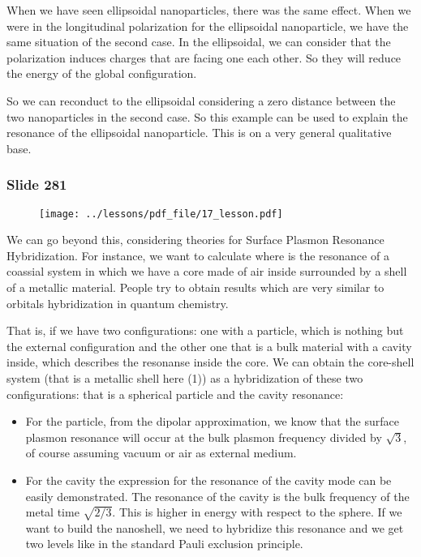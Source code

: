 \documentclass[../main/main.tex]{subfiles}
\begin{document}
When we have seen ellipsoidal nanoparticles, there was the same effect. When we were in the longitudinal polarization for the ellipsoidal nanoparticle, we have the same situation of the second case. In the ellipsoidal, we can consider that the polarization induces charges that are facing one each other. So they will reduce the energy of the global configuration.

So we can reconduct to the ellipsoidal considering a zero distance between the two nanoparticles in the second case. So this example can be used to explain the resonance of the ellipsoidal nanoparticle.
This is on a very general qualitative base.


\newpage

\subsubsection{Slide 281}

\begin{figure}[h!]
\centering
\texttt{[image: ../lessons/pdf\_file/17\_lesson.pdf]}
\end{figure}

We can go beyond this, considering theories for Surface Plasmon Resonance Hybridization.
For instance, we want to calculate where is the resonance of a coassial system in which we have a core made of air inside surrounded by a shell of a metallic material.
People try to obtain results which are very similar to orbitals hybridization in quantum chemistry.

That is, if we have two configurations:
one with a particle, which is nothing but the external configuration and the other one that is a bulk material with a cavity inside, which describes the resonanse inside the core.
We can obtain the core-shell system (that is a metallic shell here (1)) as a hybridization of these two configurations: that is a spherical particle and the cavity resonance:
\begin{itemize}
\item For the particle, from the dipolar approximation, we know that the surface plasmon resonance will occur at the bulk plasmon frequency divided by $\sqrt{3}$, of course assuming vacuum or air as external medium.
\item For the cavity the expression for the resonance of the cavity mode can be easily demonstrated. The resonance of the cavity is the bulk frequency of the metal time \( \sqrt{2/3}  \). This is higher in energy with respect to the sphere.
If we want to build the nanoshell, we need to hybridize this resonance and we get two levels like in the standard Pauli exclusion principle.

\end{itemize}
\end{document}
